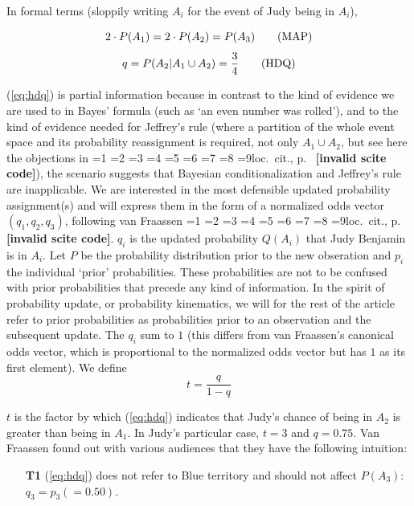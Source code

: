 \documentclass[12pt]{article}
\newcommand{\qnull}[1]{`#1'}
\newif\ifNumericalOrYear
\newcommand{\PageP}{p.~}
\newcommand{\PageP}{}
\newcommand{\nial}{\noindent} %
\newcommand{\scite}[3]{\ifnum#1=1\ifNumericalOrYear\citep{#2}\else\citeyearpar{#2}\fi\else
\ifnum#1=2\ifNumericalOrYear\citep[#3]{#2}\else\citep[{\PageP}#3]{#2}\fi\else
\ifnum#1=3\ifNumericalOrYear(\citet[#3]{#2})\else\citep[{\PageP}#3]{#2}\fi\else
\ifnum#1=4\ifNumericalOrYear\citet{#2}\else\citet{#2}\fi\else
\ifnum#1=5\ifNumericalOrYear(\citet{#2})\else\citep{#2}\fi\else
\ifnum#1=6\ifNumericalOrYear(\citet[#3]{#2})\else\citep[{\PageP}#3]{#2}\fi\else
\ifnum#1=7\ifNumericalOrYear\citep{#2}\else\citealp{#2}\fi\else
\ifnum#1=8\ifNumericalOrYear\citep[#3]{#2}\else\citealp[{\PageP}#3]{#2}\fi\else
\ifnum#1=9\ifNumericalOrYear\citep[#3]{#2}\else{}loc.\ cit., {\PageP}#3\fi\else
\textbf{[invalid scite code]}\fi\fi\fi\fi\fi\fi\fi\fi\fi}
\begin{document}
\nial In formal terms (sloppily writing $A_{i}$ for the event of Judy
being in $A_{i}$),

\begin{equation}
  \label{eq:map}
  2\cdot{}P(A_{1})=2\cdot{}P(A_{2})=P(A_{3})\tag{\mbox{MAP}}
\end{equation}
\begin{equation}
  \label{eq:hdq}
  q=P(A_{2}|A_{1}\cup{}A_{2})=\frac{3}{4}\tag{\mbox{HDQ}}
\end{equation}

\nial ({\ref{eq:hdq}}) is partial information because in contrast to
the kind of evidence we are used to in Bayes' formula (such as
\qnull{an even number was rolled}), and to the kind of evidence needed
for Jeffrey's rule (where a partition of the whole event space and its
probability reassignment is required, not only $A_{1}\cup{}A_{2}$, but
see here the objections in \scite{7}{douvenromeijn09}{}), the scenario
suggests that Bayesian conditionalization and Jeffrey's rule are
inapplicable. We are interested in the most defensible updated
probability assignment(s) and will express them in the form of a
normalized odds vector $(q_{1},q_{2},q_{3})$, following van Fraassen
\scite{1}{fraassen81}{}. $q_{i}$ is the updated probability $Q(A_{i})$
that Judy Benjamin is in $A_{i}$. Let $P$ be the probability
distribution prior to the new obseration and $p_{i}$ the individual
\qnull{prior} probabilities. These probabilities are not to be
confused with prior probabilities that precede any kind of
information. In the spirit of probability update, or probability
kinematics, we will for the rest of the article refer to prior
probabilities as probabilities prior to an observation and the
subsequent update. The $q_{i}$ sum to $1$ (this differs from van
Fraassen's canonical odds vector, which is proportional to the
normalized odds vector but has $1$ as its first element). We define
\begin{displaymath}
  t=\frac{q}{1-q}
\end{displaymath}

\nial $t$ is the factor by which ({\ref{eq:hdq}}) indicates that
Judy's chance of being in $A_{2}$ is greater than being in $A_{1}$. In
Judy's particular case, $t=3$ and $q=0.75$. Van Fraassen found out
with various audiences that they have the following intuition:

\begin{enumerate}
  \item[\textbf{T1}] ({\ref{eq:hdq}}) does not refer to Blue territory and
  should not affect $P(A_{3})$: $q_{3}=p_{3}(=0.50)$.
\end{enumerate}
\end{document}
